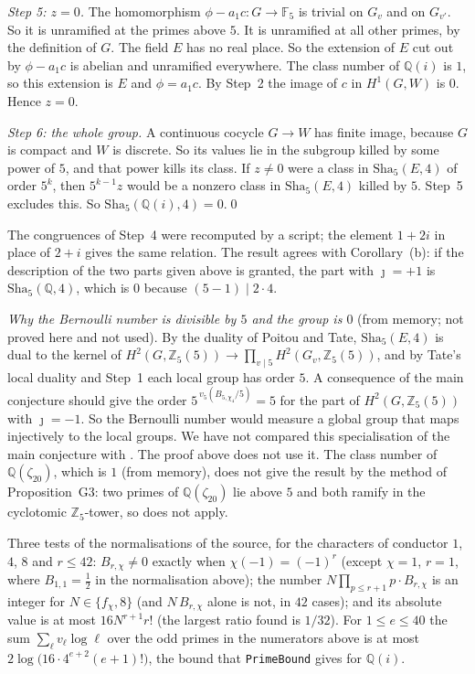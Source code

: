 \documentclass[11pt,letterpaper]{article}
\newcommand{\Z}{\mathbb Z}\newcommand{\Q}{\mathbb Q}\newcommand{\C}{\mathbb C}
\begin{document}
\emph{Step 5: $z=0$.} The homomorphism $\phi-a_1c\colon G\to\mathbb F_5$ is trivial on $G_v$ and on $G_{v'}$. So it
is unramified at the primes above $5$. It is unramified at all other primes, by the definition of $G$. The
field $E$ has no real place. So the extension of $E$ cut out by $\phi-a_1c$ is abelian and unramified
everywhere. The class number of $\Q(i)$ is $1$, so this extension is $E$ and $\phi=a_1c$. By Step~2 the image
of $c$ in $H^1(G,W)$ is $0$. Hence $z=0$.

\emph{Step 6: the whole group.} A continuous cocycle $G\to W$ has finite image, because $G$ is compact and
$W$ is discrete. So its values lie in the subgroup killed by some power of $5$, and that power kills its
class. If $z\ne0$ were a class in $\mathrm{Sha}_5(E,4)$ of order $5^{k}$, then $5^{k-1}z$ would be a nonzero
class in $\mathrm{Sha}_5(E,4)$ killed by $5$. Step~5 excludes this. So $\mathrm{Sha}_5(\Q(i),4)=0$.\qed

The congruences of Step~4 were recomputed by a script; the element $1+2i$ in place of $2+i$ gives the same
relation. The result agrees with Corollary~(b): if the description of the two parts given above is granted,
the part with $\jmath=+1$ is $\mathrm{Sha}_5(\Q,4)$, which is $0$ because $(5-1)\mid 2\cdot4$.

\emph{Why the Bernoulli number is divisible by $5$ and the group is $0$} (from memory; not proved here and not
used). By the duality of Poitou and Tate, $\mathrm{Sha}_5(E,4)$ is dual to the kernel of
$H^2(G,\Z_5(5))\to\prod_{v\mid5}H^2(G_v,\Z_5(5))$, and by Tate's local duality and Step~1 each local group has
order $5$. A consequence of the main conjecture \cite{MW84} should give the order $5^{\,v_5(B_{5,\chi_4}/5)}=5$
for the part of $H^2(G,\Z_5(5))$ with $\jmath=-1$. So the Bernoulli number would measure a global group that
maps injectively to the local groups. We have not compared this specialisation of the main conjecture with
\cite{MW84}. The proof above does not use it. The class number
of $\Q(\zeta_{20})$, which is $1$ (from memory), does not give the result by the method of Proposition~G3: two
primes of $\Q(\zeta_{20})$ lie above $5$ and both ramify in the cyclotomic $\Z_5$-tower, so
\cite[Prop.~13.22]{Was82} does not apply.

Three tests of the normalisations of the source, for the characters of conductor $1$, $4$, $8$ and
$r\le42$: $B_{r,\chi}\ne0$ exactly when $\chi(-1)=(-1)^{r}$ (except $\chi=1$, $r=1$, where
$B_{1,1}=\frac12$ in the normalisation above); the number
$N\prod_{p\le r+1}p\cdot B_{r,\chi}$ is an integer for $N\in\{f_\chi,8\}$ (and $N\,B_{r,\chi}$ alone is not, in $42$
cases); and its absolute value is at most $16N^{r+1}r!$ (the largest ratio found is $1/32$). For
$1\le e\le40$ the sum $\sum_\ell v_\ell\log\ell$ over the odd primes in the numerators above is at most
$2\log\big(16\cdot4^{e+2}(e+1)!\big)$, the bound that \texttt{PrimeBound} gives for $\Q(i)$.
\end{document}
